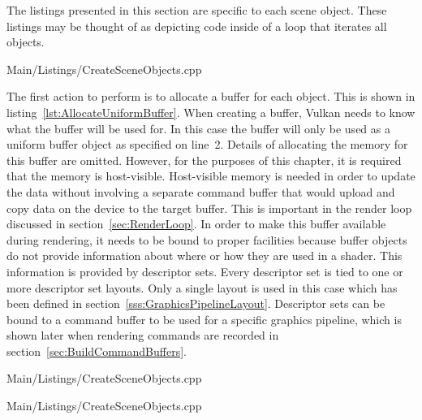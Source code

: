       The listings presented in this section are specific to each scene object.
      These listings may be thought of as depicting code inside of a loop that iterates all objects.

      
      {Main/Listings/CreateSceneObjects.cpp}

      The first action to perform is to allocate a buffer for each object.
      This is shown in listing~\ref{lst:AllocateUniformBuffer}.
      When creating a buffer, Vulkan needs to know what the buffer will be used for.
      In this case the buffer will only be used as a uniform buffer object as specified on line~2.
      Details of allocating the memory for this buffer are omitted.
      However, for the purposes of this chapter, it is required that the memory is host-visible.
      Host-visible memory is needed in order to update the data without involving a separate command buffer that would upload and copy data on the device to the target buffer.
      This is important in the render loop discussed in section~\ref{sec:RenderLoop}.
      In order to make this buffer available during rendering, it needs to be bound to proper facilities because buffer objects do not provide information about where or how they are used in a shader.
      This information is provided by descriptor sets.
      Every descriptor set is tied to one or more descriptor set layouts.
      Only a single layout is used in this case which has been defined in section~\ref{sss:GraphicsPipelineLayout}.
      Descriptor sets can be bound to a command buffer to be used for a specific graphics pipeline, which is shown later when rendering commands are recorded in section~\ref{sec:BuildCommandBuffers}.

      
      {Main/Listings/CreateSceneObjects.cpp}

      
      {Main/Listings/CreateSceneObjects.cpp}

